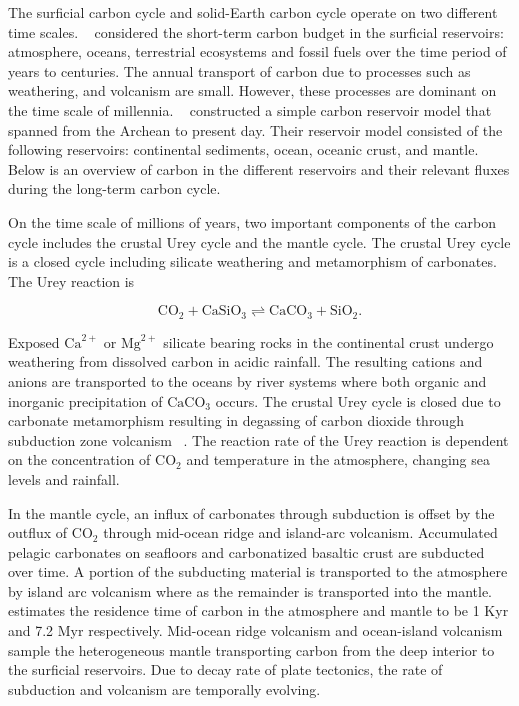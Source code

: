 The surficial carbon cycle and solid-Earth carbon cycle operate on two different time scales. ~\cite{HRA:2007} considered the short-term carbon budget in the surficial reservoirs: atmosphere, oceans, terrestrial ecosystems and fossil fuels over the time period of years to centuries. The annual transport of carbon due to processes such as weathering, and volcanism are small. However, these processes are dominant on the time scale of millennia. ~\citet{SNH-ZK:2001} constructed a simple carbon reservoir model that spanned from the Archean to present day. Their reservoir model consisted of the following reservoirs: continental sediments, ocean, oceanic crust, and mantle. Below is an overview of carbon in the different reservoirs and their relevant fluxes during the long-term carbon cycle.

On the time scale of millions of years, two important components of the carbon cycle includes the crustal Urey cycle and the mantle cycle. The crustal Urey cycle is a closed cycle including silicate weathering and metamorphism of carbonates. The Urey reaction is 

\begin{equation}
\label{EQ:Urey_reaction}
  \text{CO}_2 + \text{CaSiO}_3 \rightleftharpoons \text{CaCO}_3 + \text{SiO}_2.
\end{equation}

\noindent Exposed $\mathrm{Ca}^{2+}$ or $\mathrm{Mg}^{2+}$ silicate bearing rocks in the continental crust undergo weathering from dissolved carbon in acidic rainfall. The resulting cations and anions are transported to the oceans by river systems where both organic and inorganic precipitation of $\text{CaCO}_3$ occurs. The crustal Urey cycle is closed due to carbonate metamorphism resulting in degassing of carbon dioxide through subduction zone volcanism ~\cite{KLH-TDL-WM:2017}. The reaction rate of the Urey reaction is dependent on the concentration of $\text{CO}_2$ and temperature in the atmosphere, changing sea levels and rainfall.

In the mantle cycle, an influx of carbonates through subduction is offset by the outflux of $\text{CO}_2$ through mid-ocean ridge and island-arc volcanism.  Accumulated pelagic carbonates on seafloors and carbonatized basaltic crust are subducted over time. A portion of the subducting material is transported to the atmosphere by island arc volcanism where as the remainder is transported into the mantle. ~\citet{SNH-ZK:2001} estimates the residence time of carbon in the atmosphere and mantle to be 1 Kyr and 7.2 Myr respectively. Mid-ocean ridge volcanism and ocean-island volcanism sample the heterogeneous mantle transporting carbon from the deep interior to the surficial reservoirs. Due to decay rate of plate tectonics, the rate of subduction and volcanism are temporally evolving.

